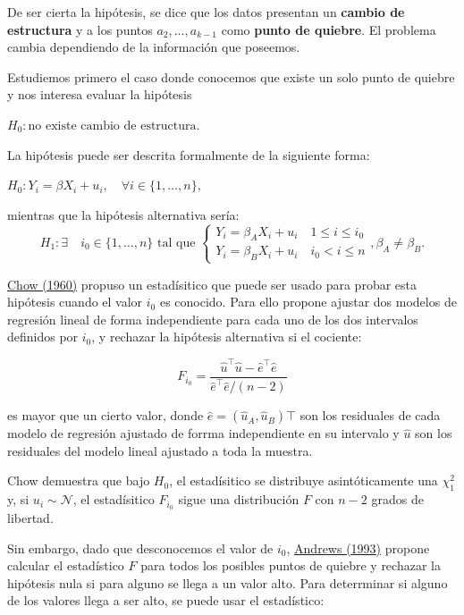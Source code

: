 \documentclass[
]{article}
\begin{document}
De ser cierta la hipótesis, se dice que los datos presentan un
\textbf{cambio de estructura} y a los puntos \(a_2, \dots, a_{k-1}\)
como \textbf{punto de quiebre}. El problema cambia dependiendo de la
información que poseemos.

Estudiemos primero el caso donde conocemos que existe un solo punto de
quiebre y nos interesa evaluar la hipótesis

\(H_0: \text{no existe cambio de estructura.}\)

La hipótesis puede ser descrita formalmente de la siguiente forma:

\(H_0: Y_i = \beta X_i + u_i, \quad \forall i\in\{1, \dots, n\},\)

mientras que la hipótesis alternativa sería:
\begin{equation*}
   H_1: \exists \quad i_0 \in \{1, \dots, n\} \text{ tal que }
   \begin{cases}
      Y_i = \beta_A X_i + u_i \quad 1 \leq i \leq i_0\\
      Y_i = \beta_B X_i + u_i \quad i_0 < i \leq n
   \end{cases},\beta_A \neq \beta_B.
\end{equation*}

\href{https://www.jstor.org/stable/1910133}{Chow (1960)} propuso un
estadísitico que puede ser usado para probar esta hipótesis cuando el
valor \(i_0\) es conocido. Para ello propone ajustar dos modelos de
regresión lineal de forma independiente para cada uno de los dos
intervalos definidos por \(i_0\), y rechazar la hipótesis alternativa si
el cociente:

\[F_{i_0} = \frac{\hat u^\top \hat u - \hat e ^\top \hat e}{\hat e^\top \hat e / (n - 2)}\]

es mayor que un cierto valor, donde
\(\hat e = (\hat u_A, \hat u_B)\top\) son los residuales de cada modelo
de regresión ajustado de forrma independiente en su intervalo y
\(\hat u\) son los residuales del modelo lineal ajustado a toda la
muestra.

Chow demuestra que bajo \(H_0\), el estadísitico se distribuye
asintóticamente una \(\chi^2_1\) y, si \(u_i \sim \mathcal N\), el
estadísitico \(F_{i_0}\) sigue una distribución \(F\) con \(n-2\) grados
de libertad.

Sin embargo, dado que desconocemos el valor de \(i_0\),
\href{https://www.jstor.org/stable/2951764}{Andrews (1993)} propone
calcular el estadístico \(F\) para todos los posibles puntos de quiebre
y rechazar la hipótesis nula si para alguno se llega a un valor alto.
Para deterrminar si alguno de los valores llega a ser alto, se puede
usar el estadístico:
\end{document}
